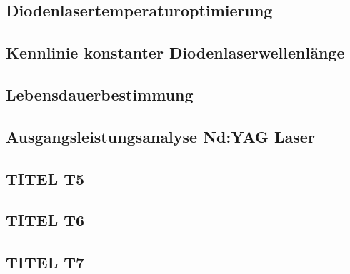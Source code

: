 \documentclass[../main.tex]{subfiles}
\begin{document}
    \subsection{Diodenlasertemperaturoptimierung}\label{subsec:1-1:Diodenlasertemperaturoptimierung}
        

    \subsection{Kennlinie konstanter Diodenlaserwellenlänge}\label{subsec:1-2:KennlinieKonstanterDiodenlaserwellenlaenge}
        

    \subsection{Lebensdauerbestimmung}\label{subsec:1-3:Lebensdauerbestimmung}
        

    \subsection{Ausgangsleistungsanalyse Nd:YAG Laser}\label{subsec:1-4:AusgangsleistungsanalyseNdYAGLaser}
        

    \subsection{TITEL T5}
    

    

    

    


    \subsection{TITEL T6}
    


    \subsection{TITEL T7}
    

    
    
\end{document}
